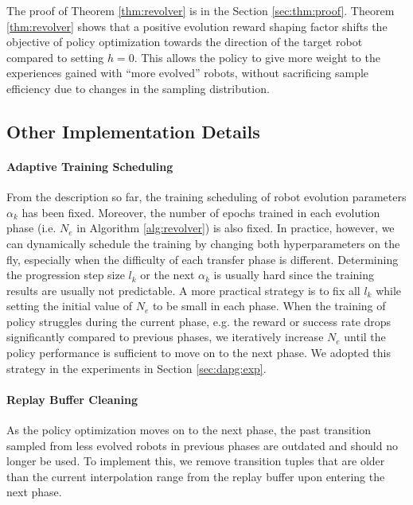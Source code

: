 \documentclass[nohyperref]{article}
\theoremstyle{plain}
\theoremstyle{definition}
\theoremstyle{remark}
\begin{document}
The proof of Theorem \ref{thm:revolver} is in the Section \ref{sec:thm:proof}.
Theorem \ref{thm:revolver} shows that a positive evolution reward shaping factor shifts the objective of policy optimization towards the direction of the target robot compared to setting $h=0$.
This allows the policy to give more weight to the experiences gained with ``more evolved'' robots, without sacrificing sample efficiency due to changes in the sampling distribution.



\subsection{Other Implementation Details}\label{sec:other:implementation}

\paragraph{Adaptive Training Scheduling}
From the description so far, the training scheduling of robot evolution parameters $\alpha_k$ has been fixed.
Moreover, the number of epochs trained in each evolution phase (i.e. $N_e$ in Algorithm \ref{alg:revolver}) is also fixed.
In practice, however, we can dynamically schedule the training by changing both hyperparameters on the fly, especially when the difficulty of each transfer phase is different.
Determining the progression step size $l_k$ or the next $\alpha_k$ is usually hard since the training results are usually not predictable.
A more practical strategy is to fix all $l_k$ while setting the initial value of $N_e$ to be small in each phase.
When the training of policy struggles during the current phase, e.g. the reward or success rate drops significantly compared to previous phases, we iteratively increase $N_e$ until the policy performance is sufficient to move on to the next phase.
We adopted this strategy in the experiments in Section \ref{sec:dapg:exp}.




\paragraph{Replay Buffer Cleaning}
As the policy optimization moves on to the next phase, the past transition sampled from less evolved robots in previous phases are outdated and should no longer be used. To implement this, we remove transition tuples that are older than the current interpolation range from the replay buffer upon entering the next phase.
\end{document}
